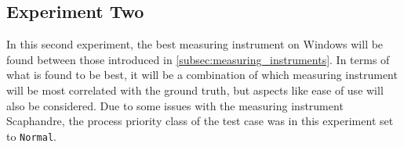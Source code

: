 \subsection{Experiment Two}\label{subsec:exp_two}

In this second experiment, the best measuring instrument on Windows will be found between those introduced in \cref{subsec:measuring_instruments}. In terms of what is found to be best, it will be a combination of which measuring instrument will be most correlated with the ground truth, but aspects like ease of use will also be considered. Due to some issues with the measuring instrument Scaphandre, the process priority class of the test case was in this experiment set to \texttt{Normal}.